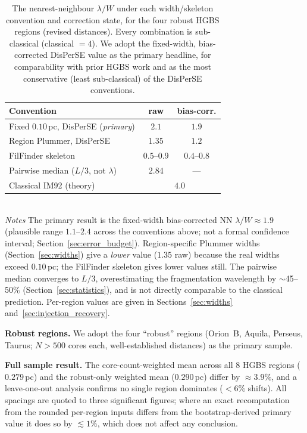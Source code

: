 \documentclass[usenatbib,twoside,twocolumn]{mnras}
\begin{document}
\begin{table}
\caption{The nearest-neighbour $\lambda/W$ under each width/skeleton convention and correction state, for the four robust HGBS regions (revised distances). Every combination is sub-classical (classical $=4$). We adopt the fixed-width, bias-corrected DisPerSE value as the primary headline, for comparability with prior HGBS work and as the most conservative (least sub-classical) of the DisPerSE conventions.}
\label{tab:headline}
\footnotesize
\setlength{\tabcolsep}{4pt}
\begin{tabular}{p{4.1cm}cc}
\toprule
Convention & raw & bias-corr. \\
\midrule
Fixed $0.10$\,pc, DisPerSE (\emph{primary}) & $2.1$ & $\mathbf{1.9}$ \\
Region Plummer, DisPerSE & $1.35$ & $1.2$ \\
FilFinder skeleton & $0.5$--$0.9$ & $0.4$--$0.8$ \\
Pairwise median ($L/3$, not $\lambda$) & $2.84$ & --- \\
\midrule
Classical IM92 (theory) & \multicolumn{2}{c}{$4.0$} \\
\bottomrule
\end{tabular}
\\[2pt]
\footnotesize
\emph{Notes} The primary result is the fixed-width bias-corrected NN $\lambda/W\approx1.9$ (plausible range $1.1$--$2.4$ across the conventions above; not a formal confidence interval; Section~\ref{sec:error_budget}). Region-specific Plummer widths (Section~\ref{sec:widths}) give a \emph{lower} value ($1.35$ raw) because the real widths exceed $0.10$\,pc; the FilFinder skeleton gives lower values still. The pairwise median converges to $L/3$, overestimating the fragmentation wavelength by $\sim$45--50\% (Section~\ref{sec:statistics}), and is not directly comparable to the classical prediction. Per-region values are given in Sections~\ref{sec:widths} and~\ref{sec:injection_recovery}.
\end{table}

\textbf{Robust regions.} We adopt the four ``robust'' regions (Orion~B, Aquila, Perseus, Taurus; $N>500$ cores each, well-established distances) as the primary sample.

\textbf{Full sample result.} The core-count-weighted mean across all 8 HGBS regions ($0.279$\,pc) and the robust-only weighted mean ($0.290$\,pc) differ by $\approx3.9\%$, and a leave-one-out analysis confirms no single region dominates ($<6\%$ shifts). All spacings are quoted to three significant figures; where an exact recomputation from the rounded per-region inputs differs from the bootstrap-derived primary value it does so by $\lesssim1\%$, which does not affect any conclusion.
\end{document}

